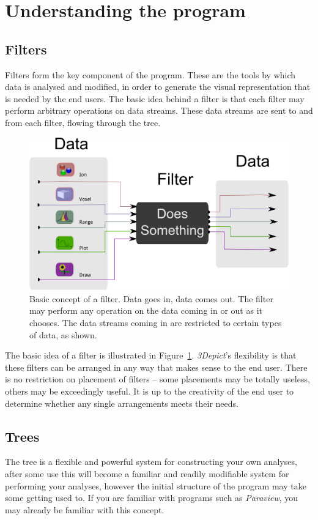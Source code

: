 \documentclass[10pt]{article}
\begin{document}
\section{Understanding the program}
\subsection{Filters}

Filters form the key component of the program. These are the tools by which data is analysed and modified, in order to generate the visual representation that is needed by the end users. The basic idea behind a filter is that each filter may perform arbitrary operations on data streams. These data streams are sent to and from each filter, flowing through the tree.

\begin{figure}[htp]
 \centering
 \includegraphics[keepaspectratio=true,width=0.65 \textwidth]{./figures/generic-filter.png}
 \caption{Basic concept of a filter. Data goes in, data comes out. The filter may perform any operation on the data coming in or out as it chooses. The data streams coming in are restricted to certain types of data, as shown. }
 \label{fig:basic-filter}
\end{figure}


The basic idea of a filter is illustrated in Figure~\ref{fig:basic-filter}. \emph{3Depict}'s flexibility is that these filters can be arranged in any way that makes sense to the end user. There is no restriction on placement of filters -- some placements may be totally useless, others may be exceedingly useful. It is up to the creativity of the end user to determine whether any single arrangements meets their needs.

\subsection{Trees}
\label{sec:treebehaviour}
The tree is a flexible and powerful system for constructing your own analyses, after some use this will become a familiar and readily modifiable system for performing your analyses, however the initial structure of the program may take some getting used to. If you are familiar with programs such as \emph{Paraview}, you may already be familiar with this concept.  
\end{document}
